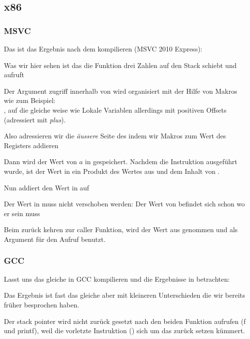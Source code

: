 \subsection{x86}

\subsubsection{MSVC}

Das ist das Ergebnis nach dem kompilieren (MSVC 2010 Express):




Was wir hier sehen ist das die \main Funktion drei Zahlen auf den Stack schiebt und  aufruft

Der Argument zugriff innerhalb von \ttf wird organisiert mit der Hilfe von Makros wie zum Beispiel:\\
, 
auf die gleiche weise wie Lokale Variablen allerdings mit positiven Offsets (adressiert mit \emph{plus}).

Also adressieren wir die \emph{äussere} Seite des  indem wir  Makros zum Wert des \EBP Registers addieren  


Dann wird der Wert von $a$ in \EAX gespeichert. Nachdem die \IMUL Instruktion ausgeführt wurde, ist
der Wert in \EAX ein Produkt des Wertes aus \EAX und dem Inhalt von .

Nun addiert \ADD den Wert in  auf \EAX

Der Wert in \EAX muss nicht verschoben werden: Der Wert von \EAX befindet sich schon wo er sein muss

Beim zurück kehren zur \gls{caller} Funktion, wird der Wert aus \EAX genommen und als Argument 
für den \printf Aufruf benutzt.




\subsubsection{GCC}


Lasst uns das gleiche in GCC kompilieren und die Ergebnisse in \IDA betrachten:



Das Ergebnis ist fast das gleiche aber mit kleineren Unterschieden die wir bereits früher
besprochen haben.

Der \gls{stack pointer} wird nicht zurück gesetzt nach den beiden Funktion aufrufen (f und printf),
weil die vorletzte  Instruktion () sich um das zurück setzen kümmert.
